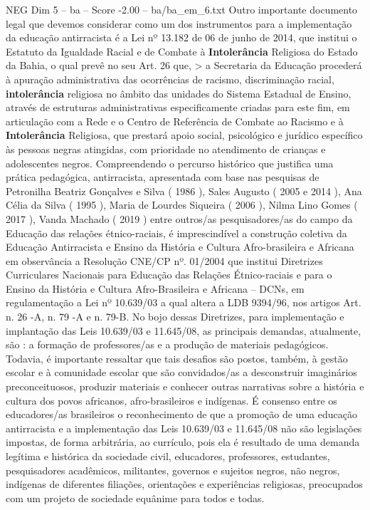 \begin{textsample}{NEG Dim 5 – ba – Score -2.00 – ba/ba\_em\_6.txt}
Outro importante documento legal que devemos considerar como um dos instrumentos para a implementação da educação antirracista é a Lei nº 13.182 de 06 de junho de 2014, que institui o Estatuto da Igualdade Racial e de Combate à \textbf{Intolerância} Religiosa do Estado da Bahia, o qual prevê no seu Art. 26 que, > a Secretaria da Educação procederá à apuração administrativa das ocorrências de racismo, discriminação racial, \textbf{intolerância} religiosa no âmbito das unidades do Sistema Estadual de Ensino, através de estruturas administrativas especificamente criadas para este fim, em articulação com a Rede e o Centro de Referência de Combate ao Racismo e à \textbf{Intolerância} Religiosa, que prestará apoio social, psicológico e jurídico específico às pessoas negras atingidas, com prioridade no atendimento de crianças e adolescentes negros.
Compreendendo o percurso histórico que justifica uma prática pedagógica, antirracista, apresentada com base nas pesquisas de Petronilha Beatriz Gonçalves e Silva ( 1986 ), Sales Augusto ( 2005 e 2014 ), Ana Célia da Silva ( 1995 ), Maria de Lourdes Siqueira ( 2006 ), Nilma Lino Gomes ( 2017 ), Vanda Machado ( 2019 ) entre outros/as pesquisadores/as do campo da Educação das relações étnico-raciais, é imprescindível a construção coletiva da Educação Antirracista e Ensino da História e Cultura Afro-brasileira e Africana em observância a Resolução CNE/CP nº. 01/2004 que institui Diretrizes Curriculares Nacionais para Educação das Relações Étnico-raciais e para o Ensino da História e Cultura Afro-Brasileira e Africana – DCNs, em regulamentação a Lei nº 10.639/03 a qual altera a LDB 9394/96, nos artigos Art. n. 26 -A, n. 79 -A e n. 79-B.
No bojo dessas Diretrizes, para implementação e implantação das Leis 10.639/03 e 11.645/08, as principais demandas, atualmente, são : a formação de professores/as e a produção de materiais pedagógicos.
Todavia, é importante ressaltar que tais desafios são postos, também, à gestão escolar e à comunidade escolar que são convidados/as a desconstruir imaginários preconceituosos, produzir materiais e conhecer outras narrativas sobre a história e cultura dos povos africanos, afro-brasileiros e indígenas.
É consenso entre os educadores/as brasileiros o reconhecimento de que a promoção de uma educação antirracista e a implementação das Leis 10.639/03 e 11.645/08 não são legislações impostas, de forma arbitrária, ao currículo, pois ela é resultado de uma demanda legítima e histórica da sociedade civil, educadores, professores, estudantes, pesquisadores acadêmicos, militantes, governos e sujeitos negros, não negros, indígenas de diferentes filiações, orientações e experiências religiosas, preocupados com um projeto de sociedade equânime para todos e todas.

\end{textsample}
